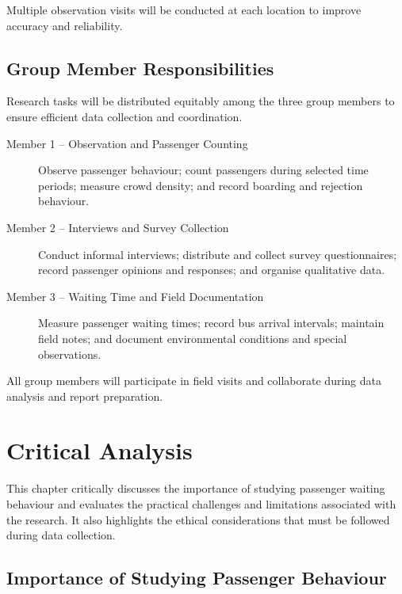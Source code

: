 \documentclass[12pt, a4paper]{report}
\begin{document}
Multiple observation visits will be conducted at each location to improve accuracy and
reliability.

\section{Group Member Responsibilities}

Research tasks will be distributed equitably among the three group members to ensure
efficient data collection and coordination.

\begin{description}
    \item[Member 1 – Observation and Passenger Counting]
        Observe passenger behaviour; count passengers during selected time periods;
        measure crowd density; and record boarding and rejection behaviour.

    \item[Member 2 – Interviews and Survey Collection]
        Conduct informal interviews; distribute and collect survey questionnaires;
        record passenger opinions and responses; and organise qualitative data.

    \item[Member 3 – Waiting Time and Field Documentation]
        Measure passenger waiting times; record bus arrival intervals; maintain field notes;
        and document environmental conditions and special observations.
\end{description}

All group members will participate in field visits and collaborate during data analysis and
report preparation.

\chapter{Critical Analysis}

This chapter critically discusses the importance of studying passenger waiting behaviour and
evaluates the practical challenges and limitations associated with the research. It also
highlights the ethical considerations that must be followed during data collection.

\section{Importance of Studying Passenger Behaviour}
\end{document}

